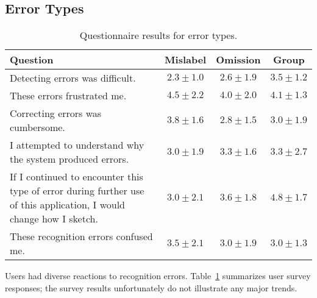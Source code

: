 \documentclass{egpubl}
\begin{document}

\subsection{Error Types}


\begin{table}
  \centering
	\begin{tabular}{|p{.35\linewidth}|c||c||c|}
	\hline 
  Question 																									& Mislabel & Omission & Group \\
  \hline
  Detecting errors was difficult. 													& $2.3\pm1.0$ & $2.6\pm1.9$ & $3.5\pm1.2$ \\
  \hline
  These errors frustrated me. 															& $4.5\pm2.2$ & $4.0\pm2.0$ & $4.1\pm1.3$ \\
  \hline
  Correcting errors was cumbersome. 												& $3.8\pm1.6$ & $2.8\pm1.5$ & $3.0\pm1.9$ \\
  \hline
  I attempted to understand why the system produced errors.	& $3.0\pm1.9$ & $3.3\pm1.6$ & $3.3\pm2.7$ \\
  \hline
  If I continued to encounter this type of error during further use of this application, I would change how I sketch.																																					& $3.0\pm2.1$ & $3.6\pm1.8$ & $4.8\pm1.7$ \\
  \hline
  These recognition errors confused me.											& $3.5\pm2.1$ & $3.0\pm1.9$ & $3.0\pm1.3$ \\
  \hline
	\end{tabular}
	\caption{Questionnaire results for error types.}
	\label{tab:TableDErrorData}
\end{table}


Users had diverse reactions to recognition errors.
Table~\ref{tab:TableDErrorData} summarizes user survey responses; the
survey results unfortunately do not illustrate any major trends.


\end{document}
